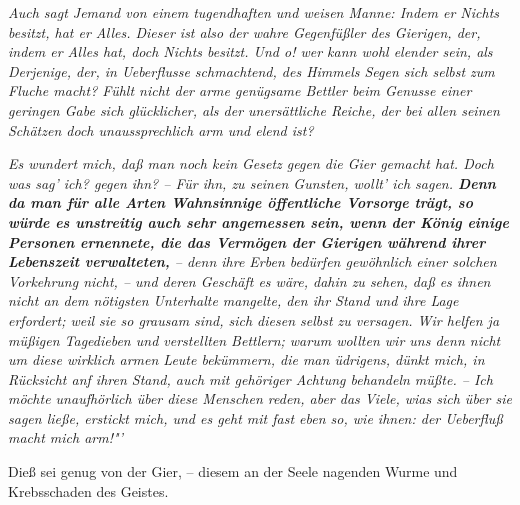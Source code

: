 \textit{Auch sagt Jemand von einem tugendhaften und weisen Manne: Indem er
Nichts
besitzt, hat er Alles. Dieser ist also der wahre Gegenfüßler des Gierigen, der,
indem er Alles hat, doch Nichts besitzt. Und o! wer kann wohl elender sein, als
Derjenige, der, in Ueberflusse schmachtend, des Himmels Segen sich selbst zum
Fluche macht? Fühlt nicht der arme genügsame
Bettler beim Genusse einer geringen
Gabe sich glücklicher, als der unersättliche Reiche, der bei allen seinen
Schätzen doch unaussprechlich arm und elend ist?}

\medskip

\textit{Es wundert mich, daß man noch kein Gesetz gegen die
Gier gemacht hat. Doch was
sag’ ich? gegen ihn? – Für ihn, zu seinen Gunsten, wollt’ ich sagen.
\label{ref:13_22_wahnsinnige}\textbf{Denn da man
für alle Arten Wahnsinnige öffentliche Vorsorge trägt, so würde es unstreitig
auch sehr angemessen sein, wenn der König einige Personen ernennete, die das
Vermögen der Gierigen während ihrer Lebenszeit verwalteten,} -- denn ihre Erben
bedürfen gewöhnlich einer solchen Vorkehrung nicht, -- und deren Geschäft es
wäre, dahin zu sehen, daß es ihnen nicht an dem nötigsten Unterhalte mangelte,
den ihr Stand und ihre Lage erfordert; weil sie so grausam sind, sich diesen
selbst zu versagen. Wir helfen ja müßigen Tagedieben und verstellten
Bettlern;
warum wollten wir uns denn nicht um diese wirklich armen Leute bekümmern, die
man üdrigens, dünkt mich, in Rücksicht anf ihren Stand, auch mit gehöriger
Achtung behandeln müßte. -- Ich möchte unaufhörlich über diese Menschen reden,
aber das Viele, wias sich über sie sagen ließe, erstickt mich, und es geht mit
fast eben so, wie ihnen: der Ueberfluß macht mich arm!"'}

\medskip

Dieß sei genug von der Gier, -- diesem an der Seele nagenden Wurme und
Krebsschaden
des Geistes.


